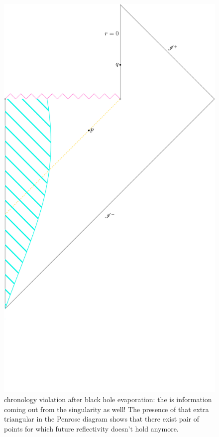 \begin{figure}
	\centering
	\includegraphics[scale=0.3]{Immagini/evaporating-black-holes/evaporating-black-holes.pdf}
	\caption{chronology violation after black hole evaporation: the is information coming out from the singularity as well! The presence of that extra triangular in the Penrose diagram shows that there exist pair of points for which future reflectivity doesn't hold anymore.}
\end{figure}

